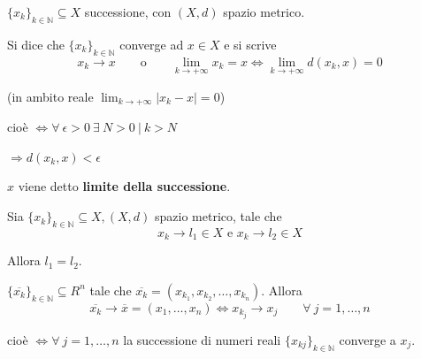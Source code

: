 \begin{definition}
	$\{x_k\}_{k\in \mathbb{N}} \subseteq X$ successione, con $(X,d)$ spazio metrico. 
	
	Si dice che $\{ x_k\}_{k \in \mathbb{N}}$ converge ad $x \in X$ e si scrive
	\begin{equation*}
		x_k \rightarrow x \qquad \text{o} \qquad \lim_{k\rightarrow +\infty} x_k = x \iff \lim_{k \rightarrow +\infty} d(x_k, x) = 0
	\end{equation*}
	
	(in ambito reale $\lim_{k \rightarrow +\infty} |x_k - x |=0$)
	
	cioè $\iff \forall \ \epsilon > 0 \ \exists \ N > 0 \ \big| \ k > N$
	
	$\Rightarrow d(x_k,x) < \epsilon$
	
	$x$ viene detto \textbf{limite della successione}.
	
\end{definition}


\begin{theorem}
	Sia $\{ x_k \}_{k \in \mathbb{N}} \subseteq X, (X,d)$ spazio metrico, tale che 
	\begin{equation*}
		x_k \rightarrow l_1 \in X \text{ e } x_k \rightarrow l_2 \in X
	\end{equation*}
	
	Allora $l_1=l_2$.
\end{theorem}


\begin{proposition}
	\label{pr:pag152}
	$\{\overline{x_k}\}_{k \in \mathbb{N}} \subseteq R^n$ tale che $\overline{x_k } = (x_{k_1}, x_{k_2}, \ldots, x_{k_n})$. Allora
	\begin{equation*}
		\overline{x_k} \rightarrow \overline{x} = (x_1, \ldots, x_n) \iff x_{k_{j}} \rightarrow x_{j} \qquad \forall \ j = 1, \ldots, n
	\end{equation*}
	
	cioè $\iff \forall \ j = 1, \ldots, n$ la successione di numeri reali $\{ x_{kj} \}_{k \in \mathbb{N}}$ converge a $x_{j}$.
\end{proposition}


